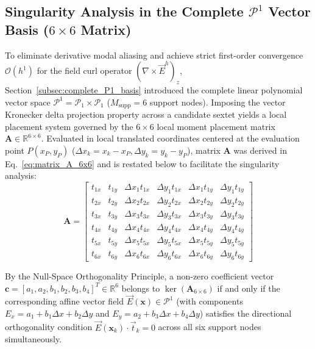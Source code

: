 \documentclass[preprint,12pt]{elsarticle}
\begin{document}
\subsection{Singularity Analysis in the Complete $\mathcal{P}^1$ Vector Basis ($6 \times 6$ Matrix)}
\label{subsec:singularities_P1}

To eliminate derivative modal aliasing and achieve strict first-order convergence $\mathcal{O}(h^1)$ for the field curl operator $(\nabla \times \vec{E}^h)_z$, Section~\ref{subsec:complete_P1_basis} introduced the complete linear polynomial vector space $\mathcal{P}^1 = \mathcal{P}_1 \times \mathcal{P}_1$ ($M_{\mathrm{supp}} = 6$ support nodes). Imposing the vector Kronecker delta projection property across a candidate sextet yields a local placement system governed by the $6 \times 6$ local moment placement matrix $\mathbf{A} \in \mathbb{R}^{6 \times 6}$. Evaluated in local translated coordinates centered at the evaluation point $P(x_P, y_P)$ ($\Delta x_k = x_k - x_P, \Delta y_k = y_k - y_P$), matrix $\mathbf{A}$ was derived in Eq.~\eqref{eq:matrix_A_6x6} and is restated below to facilitate the singularity analysis:
\begin{equation}
\mathbf{A} = \begin{bmatrix}
t_{1x} & t_{1y} & \Delta x_1 t_{1x} & \Delta y_1 t_{1x} & \Delta x_1 t_{1y} & \Delta y_1 t_{1y} \\[4pt]
t_{2x} & t_{2y} & \Delta x_2 t_{2x} & \Delta y_2 t_{2x} & \Delta x_2 t_{2y} & \Delta y_2 t_{2y} \\[4pt]
t_{3x} & t_{3y} & \Delta x_3 t_{3x} & \Delta y_3 t_{3x} & \Delta x_3 t_{3y} & \Delta y_3 t_{3y} \\[4pt]
t_{4x} & t_{4y} & \Delta x_4 t_{4x} & \Delta y_4 t_{4x} & \Delta x_4 t_{4y} & \Delta y_4 t_{4y} \\[4pt]
t_{5x} & t_{5y} & \Delta x_5 t_{5x} & \Delta y_5 t_{5x} & \Delta x_5 t_{5y} & \Delta y_5 t_{5y} \\[4pt]
t_{6x} & t_{6y} & \Delta x_6 t_{6x} & \Delta y_6 t_{6x} & \Delta x_6 t_{6y} & \Delta y_6 t_{6y}
\end{bmatrix}
\label{eq:matrix_A_P1_repeated}
\end{equation}

By the Null-Space Orthogonality Principle, a non-zero coefficient vector $\mathbf{c} = [a_1, a_2, b_1, b_2, b_3, b_4]^T \in \mathbb{R}^6$ belongs to $\ker(\mathbf{A}_{6 \times 6})$ if and only if the corresponding affine vector field $\vec{E}(\mathbf{x}) \in \mathcal{P}^1$ (with components $E_x = a_1 + b_1 \Delta x + b_2 \Delta y$ and $E_y = a_2 + b_3 \Delta x + b_4 \Delta y$) satisfies the directional orthogonality condition $\vec{E}(\mathbf{x}_k) \cdot \vec{t}_k = 0$ across all six support nodes simultaneously.
\end{document}
